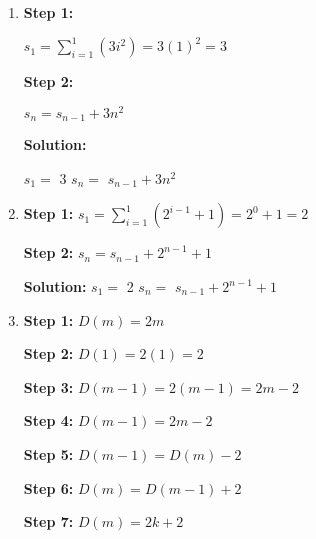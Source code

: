 
\newcommand{\laClass}       {CS 210}
\newcommand{\laSemester}    {Spring 2018}
\newcommand{\laChapter}     {2.4}
\newcommand{\laType}        {Exercise}
\newcommand{\laPoints}      {5}
\newcommand{\laTitle}       {More About Induction}
\newcommand{\laDate}        {}
\setcounter{chapter}{2}
\setcounter{section}{4}
\addtocounter{section}{-1}

\toggletrue{answerkey}





\begin{enumerate}
    \item
        \textbf{Step 1:}
        
            $s_{1} = \sum_{i=1}^{1} (3i^{2}) = 3(1)^{2} = 3$
            
        \textbf{Step 2:}
        
            $s_{n} = s_{n-1} + 3n^{2}$
            
        \textbf{Solution:}
        
            $s_{1} = $ {3}{}
            \tab[4cm]
            $s_{n} = $ {$s_{n-1} + 3n^{2}$}{}
        
    \item
        \textbf{Step 1:}
            $s_{1} = \sum_{i=1}^{1} (2^{i-1}+1) = 2^{0} + 1 = 2$
        
        \textbf{Step 2:}
            $s_{n} = s_{n-1} + 2^{n-1} + 1$
        
        \textbf{Solution:}
                $s_{1} = $ {2}{}
                \tab[4cm]
                $s_{n} = $ {$s_{n-1} + 2^{n-1} + 1$}{}

    \item
        \textbf{Step 1:}
                $D(m) = 2m$
        
        \textbf{Step 2:}
                $D(1) = 2(1) = 2$ \checkmark
        
        \textbf{Step 3:}
                $D(m-1) = 2(m-1) = 2m - 2$
        
        \textbf{Step 4:}
                $D(m-1) = 2m - 2$
        
        \textbf{Step 5:}
                $D(m-1) = D(m) - 2$
        
        \textbf{Step 6:}
                $D(m) = D(m-1) + 2$
        
        \textbf{Step 7:}
                $D(m) = 2k + 2$
        

\end{enumerate}
